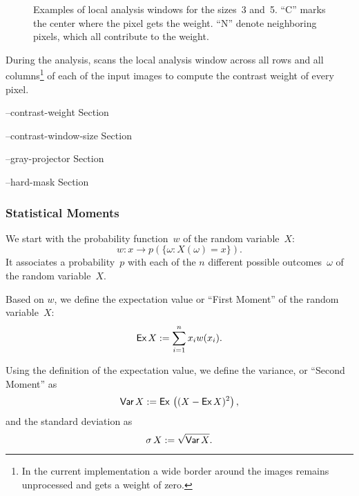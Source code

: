 \begin{figure}[htbp]
  \begin{maxipage}
    \centering
  \end{maxipage}

  \caption[Local analysis window]{Examples of local analysis windows
    for the sizes~3 and~5.  ``\textsf{C}'' marks the center where the
    pixel gets the weight.  ``\textsf{N}'' denote neighboring pixels,
    which all contribute to the
    weight.\label{fig:local-analysis-window}}
\end{figure}


During the analysis, \App{} scans the local analysis window across all
rows and all columns\footnote{In the current implementation a
   wide border around the images
  remains unprocessed and gets a weight of zero.} of each of the input
images to compute the contrast weight of every pixel.

\begin{optionsummary}
\item[--contrast-weight] Section~
\item[--contrast-window-size] Section~
\item[--gray-projector] Section~
\item[--hard-mask] Section~
\end{optionsummary}


\subsubsection[Statistical Moments]{Statistical Moments
  \label{sec:statistical-moments}
  }


We start with the probability function~$w$ of the random variable~$X$:
\[
    w: x \rightarrow p(\{\omega: X(\omega) = x\}).
\]
\noindent It associates a probability~$p$ with each of the $n$
different possible outcomes~$\omega$ of the random variable~$X$.

Based on $w$, we define the expectation value or ``First Moment''
of the random variable~$X$:
\[
    \textsf{Ex}\, X := \sum_{i = 1}^n x_i w(x_i).
\]

Using the definition of the expectation value, we define the
variance, or ``Second Moment'' as
\[
    \textsf{Var}\, X := \mbox{\textsf{Ex}\,}\left( (X - \textsf{Ex}\, X)^2 \right),
\]
\noindent and the standard deviation as
\[
    \sigma \, X := \sqrt{\textsf{Var}\, X}.
\]

